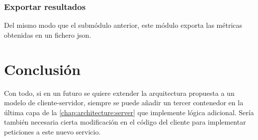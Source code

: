 \subsubsection{Exportar resultados}

Del mismo modo que el submódulo anterior, este módulo exporta las métricas obtenidas en un fichero \acrshort{json}.

\section{Conclusión}

Con todo, si en un futuro se quiere extender la arquitectura propuesta a un modelo de cliente-servidor, siempre se puede añadir un tercer contenedor en la última capa de la \autoref{chap:architecture:server} que implemente lógica adicional. Sería también necesaria cierta modificación en el código del cliente para implementar peticiones a este nuevo servicio.

